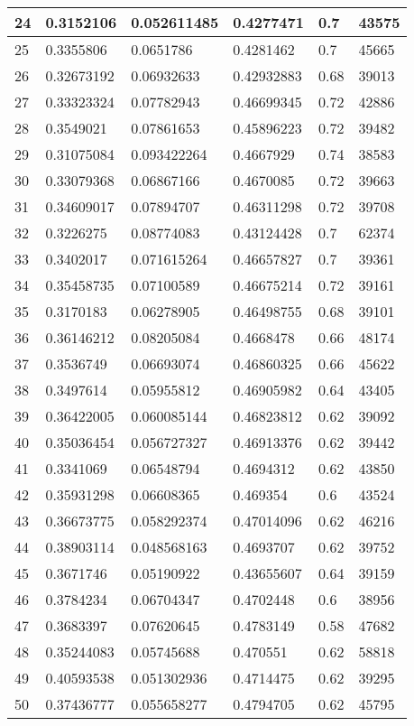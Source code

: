 \begin{longtable}{|l|l|l|l|l|l|}
24 & 0.3152106 & 0.052611485 & 0.4277471 & 0.7 & 43575 \\ \hline 
25 & 0.3355806 & 0.0651786 & 0.4281462 & 0.7 & 45665 \\ \hline 
26 & 0.32673192 & 0.06932633 & 0.42932883 & 0.68 & 39013 \\ \hline 
27 & 0.33323324 & 0.07782943 & 0.46699345 & 0.72 & 42886 \\ \hline 
28 & 0.3549021 & 0.07861653 & 0.45896223 & 0.72 & 39482 \\ \hline 
29 & 0.31075084 & 0.093422264 & 0.4667929 & 0.74 & 38583 \\ \hline 
30 & 0.33079368 & 0.06867166 & 0.4670085 & 0.72 & 39663 \\ \hline 
31 & 0.34609017 & 0.07894707 & 0.46311298 & 0.72 & 39708 \\ \hline 
32 & 0.3226275 & 0.08774083 & 0.43124428 & 0.7 & 62374 \\ \hline 
33 & 0.3402017 & 0.071615264 & 0.46657827 & 0.7 & 39361 \\ \hline 
34 & 0.35458735 & 0.07100589 & 0.46675214 & 0.72 & 39161 \\ \hline 
35 & 0.3170183 & 0.06278905 & 0.46498755 & 0.68 & 39101 \\ \hline 
36 & 0.36146212 & 0.08205084 & 0.4668478 & 0.66 & 48174 \\ \hline 
37 & 0.3536749 & 0.06693074 & 0.46860325 & 0.66 & 45622 \\ \hline 
38 & 0.3497614 & 0.05955812 & 0.46905982 & 0.64 & 43405 \\ \hline 
39 & 0.36422005 & 0.060085144 & 0.46823812 & 0.62 & 39092 \\ \hline 
40 & 0.35036454 & 0.056727327 & 0.46913376 & 0.62 & 39442 \\ \hline 
41 & 0.3341069 & 0.06548794 & 0.4694312 & 0.62 & 43850 \\ \hline 
42 & 0.35931298 & 0.06608365 & 0.469354 & 0.6 & 43524 \\ \hline 
43 & 0.36673775 & 0.058292374 & 0.47014096 & 0.62 & 46216 \\ \hline 
44 & 0.38903114 & 0.048568163 & 0.4693707 & 0.62 & 39752 \\ \hline 
45 & 0.3671746 & 0.05190922 & 0.43655607 & 0.64 & 39159 \\ \hline 
46 & 0.3784234 & 0.06704347 & 0.4702448 & 0.6 & 38956 \\ \hline 
47 & 0.3683397 & 0.07620645 & 0.4783149 & 0.58 & 47682 \\ \hline 
48 & 0.35244083 & 0.05745688 & 0.470551 & 0.62 & 58818 \\ \hline 
49 & 0.40593538 & 0.051302936 & 0.4714475 & 0.62 & 39295 \\ \hline 
50 & 0.37436777 & 0.055658277 & 0.4794705 & 0.62 & 45795 \\ \hline 
\end{longtable}